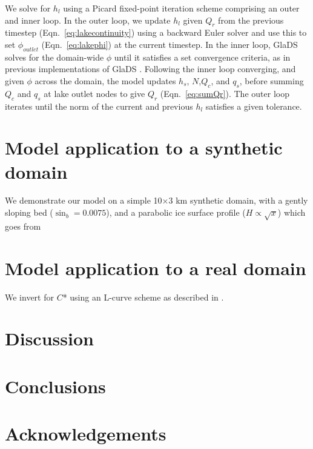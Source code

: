 \documentclass[review,jog]{igs}
\begin{document}
We solve for $h_l$ using a Picard fixed-point iteration scheme comprising an outer and inner loop. In the outer loop, we update $h_{l}$ given $Q_{r}$ from the previous timestep (Eqn.~\ref{eq:lakecontinuity}) using a backward Euler solver and use this to set $\phi_{outlet}$ (Eqn.~\ref{eq:lakephi}) at the current timestep. In the inner loop, GlaDS solves for the domain-wide $\phi$ until it satisfies a set convergence criteria, as in previous implementations of GlaDS \citep[see:][]{werder2013modeling}. Following the inner loop converging, and given $\phi$ across the domain, the model updates $h_{s}$, $N$,$Q_{c}$, and $q_{s}$, before summing $Q_{c}$ and $q_{s}$ at lake outlet nodes to give $Q_{r}$ (Eqn.~\ref{eq:sumQr}). The outer loop iterates until the norm of the current and previous $h_{l}$ satisfies a given tolerance. 



\section{Model application to a synthetic domain}\label{application:synth}

We demonstrate our model on a simple 10$\times$3 km synthetic domain, with a gently sloping bed ($\sin_{b}=0.0075$), and a parabolic ice surface profile ($H \propto \sqrt{x}$) which goes from 

\section{Model application to a real domain}\label{application:greenland}

We invert for $C$* using an L-curve scheme as described in \cite{wolovick2023regularization}. 

\section{Discussion} 

\section{Conclusions}










\section{Acknowledgements} 
\end{document}
